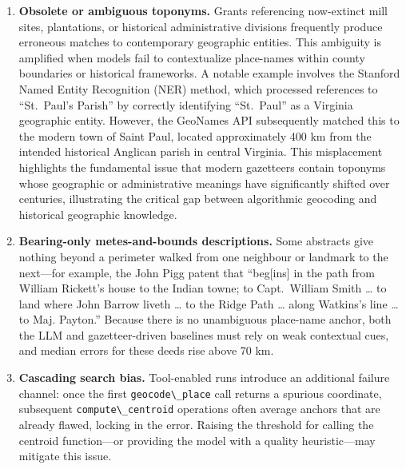 \begin{enumerate}
\def\labelenumi{\arabic{enumi}.}
\item
  \textbf{Obsolete or ambiguous toponyms.} Grants referencing
  now-extinct mill sites, plantations, or historical administrative
  divisions frequently produce erroneous matches to contemporary
  geographic entities. This ambiguity is amplified when models fail to
  contextualize place-names within county boundaries or historical
  frameworks. A notable example involves the Stanford Named Entity
  Recognition (NER) method, which processed references to ``St.~Paul's
  Parish'' by correctly identifying ``St.~Paul'' as a Virginia
  geographic entity. However, the GeoNames API subsequently matched this
  to the modern town of Saint Paul, located approximately 400 km from
  the intended historical Anglican parish in central Virginia. This
  misplacement highlights the fundamental issue that modern gazetteers
  contain toponyms whose geographic or administrative meanings have
  significantly shifted over centuries, illustrating the critical gap
  between algorithmic geocoding and historical geographic knowledge.
\item
  \textbf{Bearing-only metes-and-bounds descriptions.} Some abstracts
  give nothing beyond a perimeter walked from one neighbour or landmark
  to the next---for example, the John Pigg patent that ``beg{[}ins{]} in
  the path from William Rickett's house to the Indian towne; to
  Capt.~William Smith \ldots{} to land where John Barrow liveth \ldots{}
  to the Ridge Path \ldots{} along Watkins's line \ldots{} to Maj.
  Payton.'' Because there is no unambiguous place-name anchor, both the
  LLM and gazetteer-driven baselines must rely on weak contextual cues,
  and median errors for these deeds rise above 70 km.
\item
  \textbf{Cascading search bias.} Tool-enabled runs introduce an
  additional failure channel: once the first
  \passthrough{\lstinline!geocode\_place!} call returns a spurious
  coordinate, subsequent \passthrough{\lstinline!compute\_centroid!}
  operations often average anchors that are already flawed, locking in
  the error. Raising the threshold for calling the centroid
  function---or providing the model with a quality heuristic---may
  mitigate this issue.
\end{enumerate}

